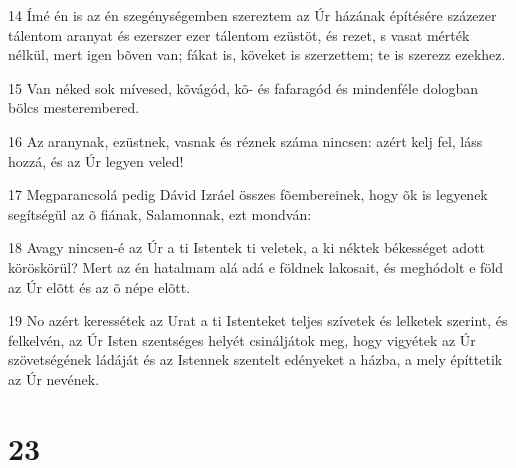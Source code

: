 \par 14 Ímé én is az én szegénységemben szereztem az Úr házának építésére százezer  tálentom aranyat és ezerszer ezer tálentom ezüstöt, és rezet, s vasat mérték nélkül, mert igen bõven van; fákat is, köveket is szerzettem; te is szerezz ezekhez.
\par 15 Van néked sok mívesed, kõvágód, kõ- és fafaragód és mindenféle dologban bölcs mesterembered.
\par 16 Az aranynak, ezüstnek, vasnak és réznek száma nincsen: azért kelj fel, láss hozzá, és az Úr legyen veled!
\par 17 Megparancsolá pedig Dávid Izráel összes fõembereinek, hogy õk is legyenek segítségül az õ fiának, Salamonnak, ezt mondván:
\par 18 Avagy nincsen-é az Úr a ti Istentek ti veletek, a ki néktek békességet adott köröskörül? Mert az én hatalmam alá adá e földnek lakosait, és meghódolt e föld az Úr elõtt és az õ népe elõtt.
\par 19 No azért keressétek az Urat a ti Istenteket teljes szívetek és lelketek szerint, és felkelvén, az Úr Isten szentséges helyét csináljátok meg, hogy vigyétek az Úr szövetségének ládáját és az Istennek szentelt edényeket a házba, a mely építtetik az Úr nevének.

\chapter{23}

